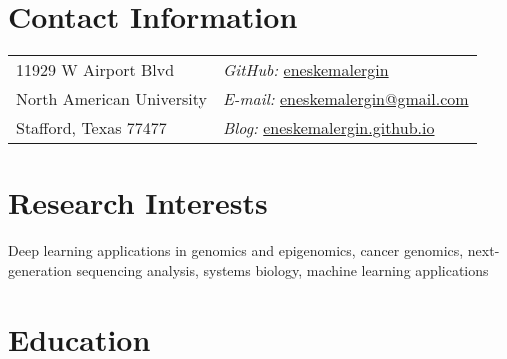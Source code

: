 \documentclass[margin,line]{res}
\newenvironment{list1}{
  \begin{list}{\ding{113}}{%
      \setlength{\itemsep}{0in}
      \setlength{\parsep}{0in} \setlength{\parskip}{0in}
      \setlength{\topsep}{0in} \setlength{\partopsep}{0in} 
      \setlength{\leftmargin}{0.17in}}}{\end{list}}
\newenvironment{list2}{
  \begin{list}{$\bullet$}{%
      \setlength{\itemsep}{0in}
      \setlength{\parsep}{0in} \setlength{\parskip}{0in}
      \setlength{\topsep}{0in} \setlength{\partopsep}{0in} 
      \setlength{\leftmargin}{0.2in}}}{\end{list}}
\begin{document}

\begin{resume}
\section{\sc Contact Information}
\vspace{.05in}
\begin{tabular}{@{}p{2in}p{4in}}
11929 W Airport Blvd         & {\it GitHub:}  \href{https://github.com/eneskemalergin}{eneskemalergin} \\            
North American University    & {\it E-mail:}  \href{mailto:eneskemalergin@gmail.com}{eneskemalergin@gmail.com}\\       
Stafford, Texas 77477        & {\it Blog:}  \href{eneskemalergin.github.io}{eneskemalergin.github.io} \\     
\end{tabular}


\section{\sc Research Interests}
Deep learning applications in genomics and epigenomics, cancer genomics, next-generation sequencing analysis, systems biology, machine learning applications

\section{\sc Education}

%


\end{resume}
\end{document}
